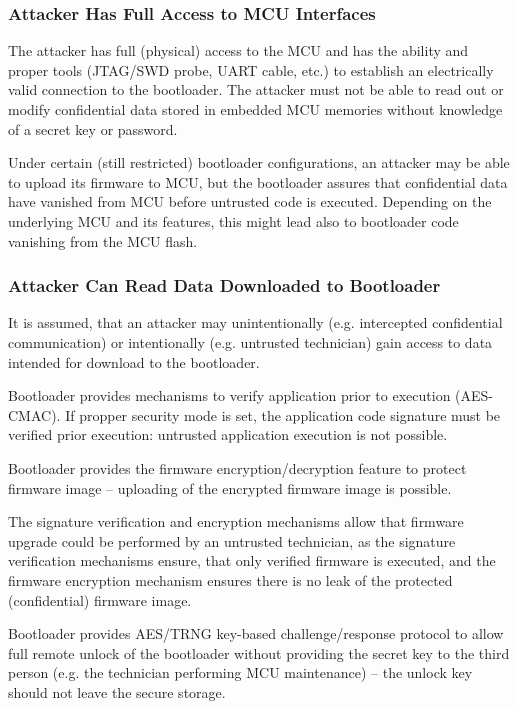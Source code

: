 \subsubsection*{Attacker Has Full Access to MCU Interfaces}

The attacker has full (physical) access to the MCU and has the ability and proper tools (JTAG/SWD probe, UART cable, etc.) 
to establish an electrically valid connection to the bootloader. The attacker must not be able to read out or modify 
confidential data stored in embedded MCU memories without knowledge of a secret key or password.

Under certain (still restricted) bootloader configurations, an attacker may be able to upload its firmware to MCU, 
but the bootloader assures that confidential data have vanished from MCU before untrusted code is executed.
Depending on the underlying MCU and its features, this might lead also to bootloader code vanishing from the MCU flash.

\subsubsection*{Attacker Can Read Data Downloaded to Bootloader}

It is assumed, that an attacker may unintentionally (e.g. intercepted confidential communication) or intentionally (e.g. untrusted technician)
gain access to data intended for download to the bootloader.

Bootloader provides mechanisms to verify application prior to execution (AES-CMAC). 
If propper security mode is set, the application code signature must be verified
prior execution: untrusted application execution is not possible.

Bootloader provides the firmware encryption/decryption feature to protect firmware image -- uploading of the encrypted firmware image is possible.


The signature verification and encryption mechanisms allow that firmware upgrade could be performed by an untrusted technician, 
as the signature verification mechanisms ensure, that only verified firmware is executed, 
and the firmware encryption mechanism ensures there is no leak of the protected (confidential) firmware image.

Bootloader provides AES/TRNG key-based challenge/response protocol to allow full remote unlock of the bootloader
without providing the secret key to the third person (e.g. the technician performing MCU maintenance) -- the unlock key should not leave the secure storage.

